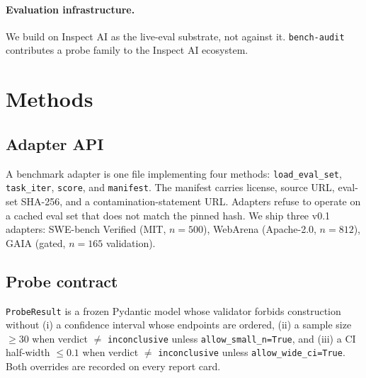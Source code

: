 \documentclass[11pt]{article}
\begin{document}
\paragraph{Evaluation infrastructure.} We build on Inspect AI
\citep{aisi2024inspect} as the live-eval substrate, not against it.
\texttt{bench-audit} contributes a probe family to the Inspect AI
ecosystem.

\section{Methods}
\label{sec:methods}

\subsection{Adapter API}
A benchmark adapter is one file implementing four methods:
\texttt{load\_eval\_set}, \texttt{task\_iter}, \texttt{score}, and
\texttt{manifest}. The manifest carries license, source URL, eval-set
SHA-256, and a contamination-statement URL. Adapters refuse to operate on
a cached eval set that does not match the pinned hash. We ship three v0.1
adapters: SWE-bench Verified (MIT, $n=500$), WebArena (Apache-2.0,
$n=812$), GAIA (gated, $n=165$ validation).

\subsection{Probe contract}
\texttt{ProbeResult} is a frozen Pydantic model whose validator forbids
construction without (i) a confidence interval whose endpoints are
ordered, (ii) a sample size $\geq 30$ when verdict $\neq$
\texttt{inconclusive} unless \texttt{allow\_small\_n=True}, and (iii) a
CI half-width $\leq 0.1$ when verdict $\neq$ \texttt{inconclusive} unless
\texttt{allow\_wide\_ci=True}. Both overrides are recorded on every
report card.
\end{document}
